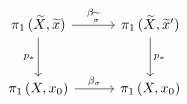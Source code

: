 \documentclass{article}
\begin{document}
    \begin{equation*}
        \begin{tikzcd}[column sep = 1cm, row sep = 1cm]
            \pi_1\,(\widetilde{X},\widetilde{x}) \ar[r, "\beta_{\widetilde{\sigma}}"] \ar[d, "p_\ast"'] & \pi_1\,(\widetilde{X},\widetilde{x}') \ar[d, "p_\ast"] \\
            \pi_1\l(X,x_0\r) \ar[r, "\beta_\sigma"] & \pi_1\l(X,x_0\r)
        \end{tikzcd}
    \end{equation*}
\end{document}
